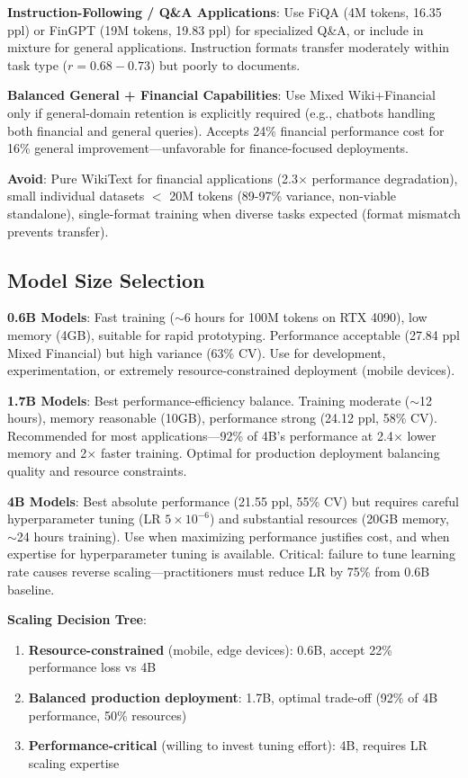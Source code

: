 \textbf{Instruction-Following / Q\&A Applications}: Use FiQA (4M tokens, 16.35 ppl) or FinGPT (19M tokens, 19.83 ppl) for specialized Q\&A, or include in mixture for general applications. Instruction formats transfer moderately within task type ($r = 0.68-0.73$) but poorly to documents.

\textbf{Balanced General + Financial Capabilities}: Use Mixed Wiki+Financial only if general-domain retention is explicitly required (e.g., chatbots handling both financial and general queries). Accepts 24\% financial performance cost for 16\% general improvement—unfavorable for finance-focused deployments.

\textbf{Avoid}: Pure WikiText for financial applications (2.3$\times$ performance degradation), small individual datasets $<$ 20M tokens (89-97\% variance, non-viable standalone), single-format training when diverse tasks expected (format mismatch prevents transfer).

\subsection{Model Size Selection}

\textbf{0.6B Models}: Fast training ($\sim$6 hours for 100M tokens on RTX 4090), low memory (4GB), suitable for rapid prototyping. Performance acceptable (27.84 ppl Mixed Financial) but high variance (63\% CV). Use for development, experimentation, or extremely resource-constrained deployment (mobile devices).

\textbf{1.7B Models}: Best performance-efficiency balance. Training moderate ($\sim$12 hours), memory reasonable (10GB), performance strong (24.12 ppl, 58\% CV). Recommended for most applications—92\% of 4B's performance at 2.4$\times$ lower memory and 2$\times$ faster training. Optimal for production deployment balancing quality and resource constraints.

\textbf{4B Models}: Best absolute performance (21.55 ppl, 55\% CV) but requires careful hyperparameter tuning (LR $5 \times 10^{-6}$) and substantial resources (20GB memory, $\sim$24 hours training). Use when maximizing performance justifies cost, and when expertise for hyperparameter tuning is available. Critical: failure to tune learning rate causes reverse scaling—practitioners must reduce LR by 75\% from 0.6B baseline.

\textbf{Scaling Decision Tree}:
\begin{enumerate}
\item \textbf{Resource-constrained} (mobile, edge devices): 0.6B, accept 22\% performance loss vs 4B
\item \textbf{Balanced production deployment}: 1.7B, optimal trade-off (92\% of 4B performance, 50\% resources)
\item \textbf{Performance-critical} (willing to invest tuning effort): 4B, requires LR scaling expertise
\end{enumerate}

